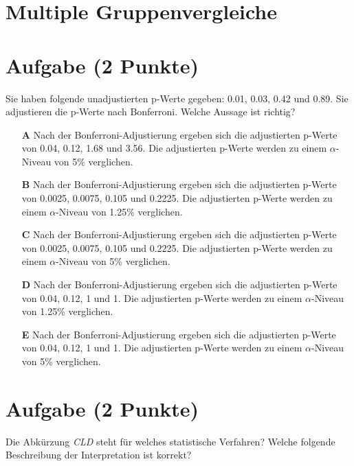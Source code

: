 \documentclass[a4paper, 9pt]{scrartcl}\usepackage[]{graphicx}\usepackage[]{xcolor}
\begin{document}
\section*{Multiple Gruppenvergleiche}    

\section{Aufgabe \hfill (2 Punkte)}



Sie haben folgende unadjustierten p-Werte gegeben: 0.01, 0.03, 0.42 und 0.89. Sie adjustieren die p-Werte nach
Bonferroni. Welche Aussage ist richtig?



\begin{enumerate}
\item [\textbf{A} \msquare] Nach der Bonferroni-Adjustierung ergeben sich die adjustierten p-Werte von 0.04, 0.12, 1.68 und 3.56. Die adjustierten p-Werte werden zu einem $\alpha$-Niveau von 5\% verglichen.
\item [\textbf{B} \msquare] Nach der Bonferroni-Adjustierung ergeben sich die adjustierten p-Werte von 0.0025, 0.0075, 0.105 und 0.2225. Die adjustierten p-Werte werden zu einem $\alpha$-Niveau von 1.25\% verglichen.
\item [\textbf{C} \msquare] Nach der Bonferroni-Adjustierung ergeben sich die adjustierten p-Werte von 0.0025, 0.0075, 0.105 und 0.2225. Die adjustierten p-Werte werden zu einem $\alpha$-Niveau von 5\% verglichen.
\item [\textbf{D} \msquare] Nach der Bonferroni-Adjustierung ergeben sich die adjustierten p-Werte von 0.04, 0.12, 1 und 1. Die adjustierten p-Werte werden zu einem $\alpha$-Niveau von 1.25\% verglichen.
\item [\textbf{E} \msquare] Nach der Bonferroni-Adjustierung ergeben sich die adjustierten p-Werte von 0.04, 0.12, 1 und 1. Die adjustierten p-Werte werden zu einem $\alpha$-Niveau von 5\% verglichen.
\end{enumerate}

\section{Aufgabe \hfill (2 Punkte)}



Die Abkürzung \textit{CLD} steht für welches statistische Verfahren? Welche folgende Beschreibung der Interpretation ist korrekt?
\end{document}
